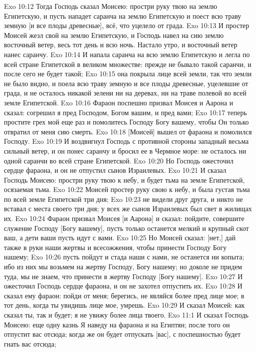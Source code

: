 \rsbpar\vs Exo 10:12 Тогда Господь сказал Моисею: простри руку твою на землю Египетскую, и пусть нападет саранча на землю Египетскую и поест всю траву земную [и все плоды древесные], всё, что уцелело от града.
\vs Exo 10:13 И простер Моисей жезл свой на землю Египетскую, и Господь навел на сию землю восточный ветер,  весь тот день и всю ночь. Настало утро, и восточный ветер нанес саранчу.
\vs Exo 10:14 И напала саранча на всю землю Египетскую и легла по всей стране Египетской в великом множестве: прежде не бывало такой саранчи, и после сего не будет такой;
\vs Exo 10:15 она покрыла лице всей земли, так что земли не было видно, и поела всю траву земную и все плоды древесные, уцелевшие от града, и не осталось никакой зелени ни на деревах, ни на траве полевой во всей земле Египетской.
\vs Exo 10:16 Фараон поспешно призвал Моисея и Аарона и сказал: согрешил я пред Господом, Богом вашим, и пред вами;
\vs Exo 10:17 теперь простите грех мой еще раз и помолитесь Господу Богу вашему, чтобы Он только отвратил от меня сию смерть.
\vs Exo 10:18 [Моисей] вышел от фараона и помолился Господу.
\vs Exo 10:19 И воздвигнул Господь с противной стороны западный весьма сильный ветер, и он понес саранчу и бросил ее в Чермное море: не осталось ни одной саранчи во всей стране Египетской.
\vs Exo 10:20 Но Господь ожесточил сердце фараона, и он не отпустил сынов Израилевых.
\rsbpar\vs Exo 10:21 И сказал Господь Моисею: простри руку твою к небу, и будет тьма на земле Египетской, осязаемая тьма.
\vs Exo 10:22 Моисей простер руку свою к небу, и была густая тьма по всей земле Египетской три дня;
\vs Exo 10:23 не видели друг друга, и никто не вставал с места своего три дня; у всех же сынов Израилевых был свет в жилищах их.
\vs Exo 10:24 Фараон призвал Моисея [и Аарона] и сказал: пойдите, совершите служение Господу [Богу вашему], пусть только останется мелкий и крупный скот ваш, а дети ваши пусть идут с вами.
\vs Exo 10:25 Но Моисей сказал: [нет,] дай также в руки наши жертвы и всесожжения, чтобы принести Господу Богу нашему;
\vs Exo 10:26 пусть пойдут и стада наши с нами, не останется ни копыта; ибо из них мы возьмем на жертву Господу, Богу нашему; но доколе не придем туда, мы не знаем, что принести в жертву Господу [Богу нашему].
\vs Exo 10:27 И ожесточил Господь сердце фараона, и он не захотел отпустить их.
\vs Exo 10:28 И сказал ему фараон: пойди от меня; берегись, не являйся более пред лице мое; в тот день, когда ты увидишь лице мое, умрешь.
\vs Exo 10:29 И сказал Моисей: как сказал ты, так и будет; я не увижу более лица твоего.
\vs Exo 11:1 И сказал Господь Моисею: еще одну казнь Я наведу на фараона и на Египтян; после того он отпустит вас отсюда; когда же он будет отпускать [вас], с поспешностью будет гнать вас отсюда;

